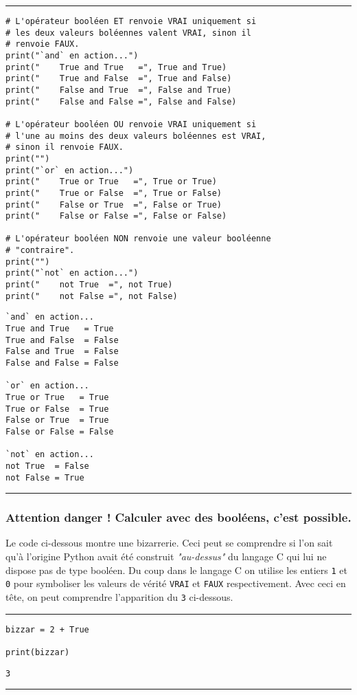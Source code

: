 \bigskip
{\hrule height .5mm}
\begin{verbatim}
# L'opérateur booléen ET renvoie VRAI uniquement si
# les deux valeurs boléennes valent VRAI, sinon il
# renvoie FAUX.
print("`and` en action...")
print("    True and True   =", True and True)
print("    True and False  =", True and False)
print("    False and True  =", False and True)
print("    False and False =", False and False)

# L'opérateur booléen OU renvoie VRAI uniquement si
# l'une au moins des deux valeurs boléennes est VRAI,
# sinon il renvoie FAUX.
print("")
print("`or` en action...")
print("    True or True   =", True or True)
print("    True or False  =", True or False)
print("    False or True  =", False or True)
print("    False or False =", False or False)

# L'opérateur booléen NON renvoie une valeur booléenne
# "contraire".
print("")
print("`not` en action...")
print("    not True  =", not True)
print("    not False =", not False)
\end{verbatim}
 \color{ForestGreen}
\vspace{-1.5em}
\begin{verbatim}
`and` en action...
True and True   = True
True and False  = False
False and True  = False
False and False = False

`or` en action...
True or True   = True
True or False  = True
False or True  = True
False or False = False

`not` en action...
not True  = False
not False = True
\end{verbatim} \color{Black}
{\hrule height .5mm}
\bigskip


\subsubsection{Attention danger ! Calculer avec des booléens, c'est possible.}

Le code ci-dessous montre une bizarrerie. Ceci peut se comprendre si l'on sait qu'à l'origine Python avait été construit \textit{"au-dessus"} du langage C qui lui ne dispose pas de type booléen. Du coup dans le langage C on utilise les entiers \texttt{1} et \texttt{0} pour symboliser les valeurs de vérité \texttt{VRAI} et \texttt{FAUX} respectivement. Avec ceci en tête, on peut comprendre l'apparition du \texttt{3} ci-dessous.


\bigskip
{\hrule height .5mm}
\begin{verbatim}
bizzar = 2 + True

print(bizzar)
\end{verbatim}
 \color{ForestGreen}
\vspace{-1.5em}
\begin{verbatim}
3
\end{verbatim} \color{Black}
{\hrule height .5mm}
\bigskip